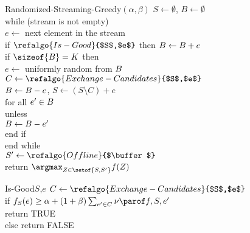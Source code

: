 \documentclass[oneside,letterpaper]{scrartcl} \usepackage{macros}
\begin{document}
\begin{figure}
\centering
  \begin{minipage}{6.9cm}
    \begin{framed}
      \begin{pseudocode}
        \begin{routine}{Randomized-Streaming-Greedy$(\alpha,\beta)$}
          $S \gets \emptyset$, $B \gets \emptyset$ \\ while (stream is not empty) \\
          \> $e \gets$ next element in the stream\\
          \> if $\refalgo{Is-Good}{$S$,$e$}$ then $B \gets B + e$ \\
          \> if $\sizeof{\buffer} = \bufferlimit$ then \+ \\
          \> $e \gets$ uniformly random from $B$ \\
          \> $C \gets \refalgo{Exchange-Candidates}{$S$,$e$}$ \\\> $B \gets B - e$, $S \gets (S \setminus C) + e$ \\
          \> for all $e' \in B$ \\
          \> \> unless \\
          \> \> \> $B \gets B - e'$\\
          end if \\
          \< end while \- \\
          $S' \gets \refalgo{Offline}{$\buffer$}$ \\
          return $\argmax_{Z \in \setof{S,S'}} f(Z)$
        \end{routine}
      \end{pseudocode}
    \end{framed}
  \end{minipage}
\qquad
  \begin{minipage}{6.8cm}
    \begin{framed}
      \begin{pseudocode}
        \begin{routine}{Is-Good}{$S$,$e$}
          $C \gets \refalgo{Exchange-Candidates}{$S$,$e$}$\\
          if $f_S(e) \geq \alpha + (1 + \beta) \sum_{e' \in C}
          \incvalueof{f}{S}{e'}$ \\
          \> return TRUE\\
          else return FALSE
        \end{routine}
      \end{pseudocode}
    \end{framed}
  \end{minipage}
\end{figure}
\end{document}
